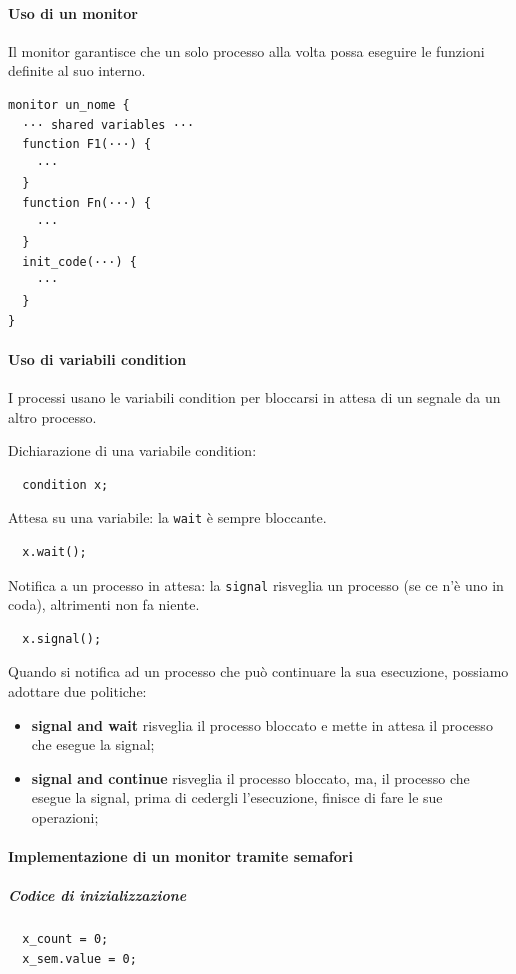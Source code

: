 \documentclass[12pt,a4paper]{article}
\begin{document}
\paragraph{Uso di un monitor}
Il monitor garantisce che un solo processo alla volta possa eseguire le
funzioni definite al suo interno.

\begin{verbatim}
monitor un_nome {
  ··· shared variables ···
  function F1(···) {
    ···
  }
  function Fn(···) {
    ···
  }
  init_code(···) {
    ···
  }
}
\end{verbatim}

\paragraph{Uso di variabili condition}
I processi usano le variabili condition per bloccarsi in attesa di un segnale
da un altro processo.

Dichiarazione di una variabile condition:
\begin{verbatim}
  condition x;
\end{verbatim}

Attesa su una variabile: la \texttt{wait} è sempre bloccante.
\begin{verbatim}
  x.wait();
\end{verbatim}

Notifica a un processo in attesa: la \texttt{signal} risveglia
un processo (se ce n'è uno in coda), altrimenti non fa niente.
\begin{verbatim}
  x.signal();
\end{verbatim}

Quando si notifica ad un processo che può continuare la sua esecuzione,
possiamo adottare due politiche:
\begin{itemize}
  \item \textbf{signal and wait} risveglia il processo bloccato e mette
    in attesa il processo che esegue la signal;
  \item \textbf{signal and continue} risveglia il processo bloccato, ma,
    il processo che esegue la signal, prima di cedergli l'esecuzione,
    finisce di fare le sue operazioni;
\end{itemize}

\paragraph{Implementazione di un monitor tramite semafori}
\subparagraph{Codice di inizializzazione}
\begin{verbatim}
  x_count = 0;
  x_sem.value = 0;
\end{verbatim}
\end{document}
